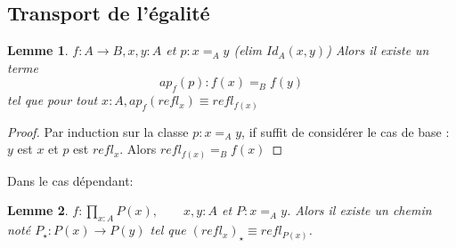 \documentclass{article}
\newtheorem{lemma}{Lemme}
\begin{document}
\subsection{Transport de l'égalité}
\begin{lemma}
$f : A \to B, x,y :A$ et $p:x=_A y$ (elim $Id_A(x,y)$)
Alors il existe un terme
\[ap_f(p) : f(x) =_B f(y)\]
tel que pour tout $x:A, ap_f (refl_x) \equiv refl_{f(x)}$
\end{lemma}

\begin{proof}
Par induction sur la classe $p: x=_A y$, if suffit de considérer le cas de base : $y$ est $x$ et $p$ est $refl_x$. Alors $refl_{f(x)} =_B f(x)$


\end{proof}


Dans le cas dépendant:
\begin{lemma}

$f : \prod_{x:A} P(x), \qquad x,y :A$ et $P:x=_A y$. Alors il existe un chemin noté $P_\star : P(x) \to P(y)$ tel que $(refl_x)_\star \equiv refl_{P(x)}$.
\end{lemma}
\end{document}
